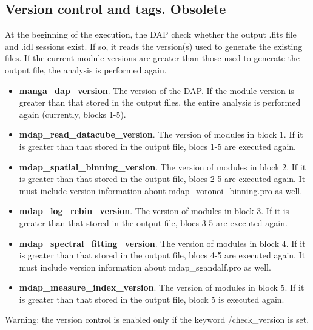 \documentclass[11pt]{book}
\begin{document}


\subsection{Version control and tags. Obsolete}
\label{dap_sec:dap_version}


At the beginning of the execution, the DAP check whether the output
.fits file and .idl sessions exist. If so, it reads the version(s)
used to generate the existing files. If the current module versions
are greater than those used to generate the output file, the analysis
is performed again.

\begin{itemize}

\item {\bf manga\_dap\_version}. The version of the DAP. If the module
  version is greater than that stored in the output files, the entire
  analysis is performed again (currently, blocks 1-5).

\item {\bf mdap\_read\_datacube\_version}. The version of modules in
  block 1. If it is greater than that stored in the output file, blocs
  1-5 are executed again.

\item {\bf mdap\_spatial\_binning\_version}. The version of modules in
  block 2. If it is greater than that stored in the output file, blocs
  2-5 are executed again. It must include version information about
  mdap\_voronoi\_binning.pro as well.

\item {\bf mdap\_log\_rebin\_version}. The version of modules in
  block 3. If it is greater than that stored in the output file, blocs
  3-5 are executed again.

\item {\bf mdap\_spectral\_fitting\_version}. The version of modules
  in block 4. If it is greater than that stored in the output file,
  blocs 4-5 are executed again. It must include version information
  about mdap\_sgandalf.pro as well.

\item {\bf mdap\_measure\_index\_version}. The version of modules in
  block 5. If it is greater than that stored in the output file, block
  5 is executed again.

\end{itemize}

Warning: the version control is enabled only if the keyword
/check\_version is set.
\end{document}

